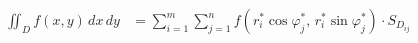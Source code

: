 \documentclass[preview]{standalone}
\begin{document}
\begin{align*}
\iint_D f(x, y)\,dx\,dy &= \sum_{i=1}^m \sum_{j=1}^n f\left(r_i^* \cos\varphi_j^*,\, r_i^* \sin\varphi_j^*\right)\cdot S_{D_{ij}} \\
\end{align*}
\end{document}
